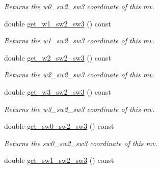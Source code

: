 \begin{DoxyCompactItemize}
\begin{DoxyCompactList}\small\item\em Returns the w0\-\_\-sw2\-\_\-sw3 coordinate of this mv. \end{DoxyCompactList}\item 
\hypertarget{classe3ga_1_1mv_a8bdb2fe3626f8f51568e3e913308d3d6}{double \hyperlink{classe3ga_1_1mv_a8bdb2fe3626f8f51568e3e913308d3d6}{get\-\_\-w1\-\_\-sw2\-\_\-sw3} () const }\label{classe3ga_1_1mv_a8bdb2fe3626f8f51568e3e913308d3d6}

\begin{DoxyCompactList}\small\item\em Returns the w1\-\_\-sw2\-\_\-sw3 coordinate of this mv. \end{DoxyCompactList}\item 
\hypertarget{classe3ga_1_1mv_a54d21fba162c5de9ca1d76658fc3b1d4}{double \hyperlink{classe3ga_1_1mv_a54d21fba162c5de9ca1d76658fc3b1d4}{get\-\_\-w2\-\_\-sw2\-\_\-sw3} () const }\label{classe3ga_1_1mv_a54d21fba162c5de9ca1d76658fc3b1d4}

\begin{DoxyCompactList}\small\item\em Returns the w2\-\_\-sw2\-\_\-sw3 coordinate of this mv. \end{DoxyCompactList}\item 
\hypertarget{classe3ga_1_1mv_a2743282712087c067f2e4b9060893071}{double \hyperlink{classe3ga_1_1mv_a2743282712087c067f2e4b9060893071}{get\-\_\-w3\-\_\-sw2\-\_\-sw3} () const }\label{classe3ga_1_1mv_a2743282712087c067f2e4b9060893071}

\begin{DoxyCompactList}\small\item\em Returns the w3\-\_\-sw2\-\_\-sw3 coordinate of this mv. \end{DoxyCompactList}\item 
\hypertarget{classe3ga_1_1mv_a775cfb7b739187f4a0b1ef17b690ec90}{double \hyperlink{classe3ga_1_1mv_a775cfb7b739187f4a0b1ef17b690ec90}{get\-\_\-sw0\-\_\-sw2\-\_\-sw3} () const }\label{classe3ga_1_1mv_a775cfb7b739187f4a0b1ef17b690ec90}

\begin{DoxyCompactList}\small\item\em Returns the sw0\-\_\-sw2\-\_\-sw3 coordinate of this mv. \end{DoxyCompactList}\item 
\hypertarget{classe3ga_1_1mv_a928fbe60e79e0450d432e904d467c28d}{double \hyperlink{classe3ga_1_1mv_a928fbe60e79e0450d432e904d467c28d}{get\-\_\-sw1\-\_\-sw2\-\_\-sw3} () const }\label{classe3ga_1_1mv_a928fbe60e79e0450d432e904d467c28d}


\end{DoxyCompactItemize}
